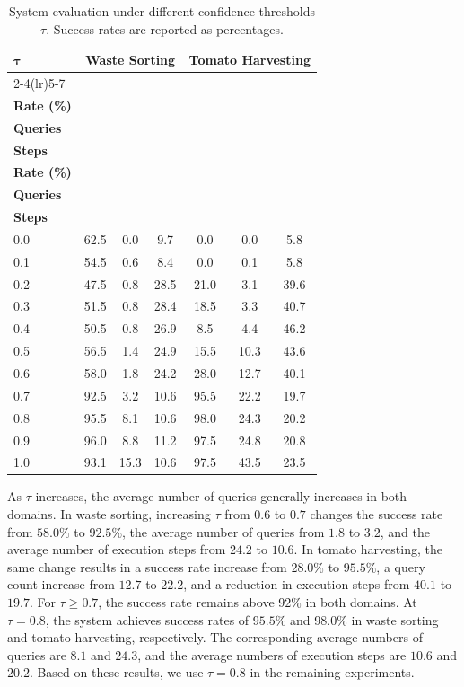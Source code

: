 \begin{table}[t]
\centering
\caption{System evaluation under different confidence thresholds $\tau$. Success rates are reported as percentages.}
\label{tab:sys_tau}
\small
\setlength{\tabcolsep}{4pt}
\begin{tabular*}{\textwidth}{@{\extracolsep{\fill}}lcccccc}
\toprule
\multirow{2}{*}{$\boldsymbol{\tau}$} & \multicolumn{3}{c}{\textbf{Waste Sorting}} & \multicolumn{3}{c}{\textbf{Tomato Harvesting}} \\
\cmidrule(lr){2-4}\cmidrule(lr){5-7}
& \makecell{\textbf{Success}\\\textbf{Rate (\%)}} & \makecell{\textbf{Avg.}\\\textbf{Queries}} & \makecell{\textbf{Avg.}\\\textbf{Steps}} & \makecell{\textbf{Success}\\\textbf{Rate (\%)}} & \makecell{\textbf{Avg.}\\\textbf{Queries}} & \makecell{\textbf{Avg.}\\\textbf{Steps}} \\
\midrule
0.0 & 62.5 & 0.0  & 9.7  & 0.0  & 0.0  & 5.8  \\
0.1 & 54.5 & 0.6  & 8.4  & 0.0  & 0.1  & 5.8  \\
0.2 & 47.5 & 0.8  & 28.5 & 21.0 & 3.1  & 39.6 \\
0.3 & 51.5 & 0.8  & 28.4 & 18.5 & 3.3  & 40.7 \\
0.4 & 50.5 & 0.8  & 26.9 & 8.5  & 4.4  & 46.2 \\
0.5 & 56.5 & 1.4  & 24.9 & 15.5 & 10.3 & 43.6 \\
0.6 & 58.0 & 1.8  & 24.2 & 28.0 & 12.7 & 40.1 \\
0.7 & 92.5 & 3.2  & 10.6 & 95.5 & 22.2 & 19.7 \\
0.8 & 95.5 & 8.1  & 10.6 & 98.0 & 24.3 & 20.2 \\
0.9 & 96.0 & 8.8  & 11.2 & 97.5 & 24.8 & 20.8 \\
1.0 & 93.1 & 15.3 & 10.6 & 97.5 & 43.5 & 23.5 \\
\bottomrule
\end{tabular*}
\end{table}


As $\tau$ increases, the average number of queries generally increases in both domains. In waste sorting, increasing $\tau$ from $0.6$ to $0.7$ changes the success rate from $58.0\%$ to $92.5\%$, the average number of queries from $1.8$ to $3.2$, and the average number of execution steps from $24.2$ to $10.6$. In tomato harvesting, the same change results in a success rate increase from $28.0\%$ to $95.5\%$, a query count increase from $12.7$ to $22.2$, and a reduction in execution steps from $40.1$ to $19.7$. For $\tau \geq 0.7$, the success rate remains above $92\%$ in both domains. At $\tau=0.8$, the system achieves success rates of $95.5\%$ and $98.0\%$ in waste sorting and tomato harvesting, respectively. The corresponding average numbers of queries are $8.1$ and $24.3$, and the average numbers of execution steps are $10.6$ and $20.2$. Based on these results, we use $\tau=0.8$ in the remaining experiments.


